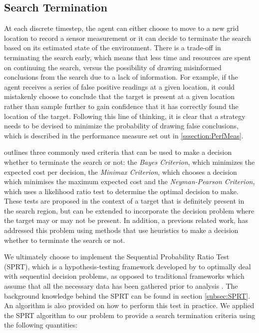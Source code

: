 
\subsection{Search Termination}\label{subsubsec:SeachTerminationMethodology}
\workinprogress

At each discrete timestep, the agent can either choose to move to a new grid location to record a sensor measurement or it can decide to terminate the search based on its estimated state of the environment. There is a trade-off in terminating the search early, which means that less time and resources are spent on continuing the search, versus the possibility of drawing misinformed conclusions from the search due to a lack of information. For example, if the agent receives a series of false positive readings at a given location, it could mistakenly choose to conclude that the target is present at a given location rather than sample further to gain confidence that it has correctly found the location of the target. Following this line of thinking, it is clear that a strategy needs to be devised to minimize the probability of drawing false conclusions, which is described in the performance measure set out in \ref{sssection:PerfMeas}.\par
\cite{PollockSearchInterfaces} outlines three commonly used criteria that can be used to make a decision whether to terminate the search or not: the \textit{Bayes Criterion}, which minimizes the expected cost per decision, the \textit{Minimax Criterion}, which chooses a decision which minimises the maximum expected cost and the \textit{Neyman-Pearson Criterion}, which uses a likelihood ratio test to determine the optimal decision to make. These tests are proposed in the context of a target that is definitely present in the search region, but can be extended to incorporate the decision problem where the target may or may not be present. In addition, a previous related work, \cite{Chung2007ASearchb} has addressed this problem using methods that use heuristics to make a decision whether to terminate the search or not. 

We ultimately choose to implement the Sequential Probability Ratio Test (SPRT), which is a hypothesis-testing framework developed by \citeauthor{Wald1950BayesProblems} to optimally deal with sequential decision problems, as opposed to traditional frameworks which assume that all the necessary data has been gathered prior to analysis \cite{Wald1950BayesProblems}. The background knowledge behind the SPRT can be found in section \ref{subsec:SPRT}. An algorithm is also provided on how to perform this test in practice.
We applied the SPRT algorithm to our problem to provide a search termination criteria using the following quantities: 

